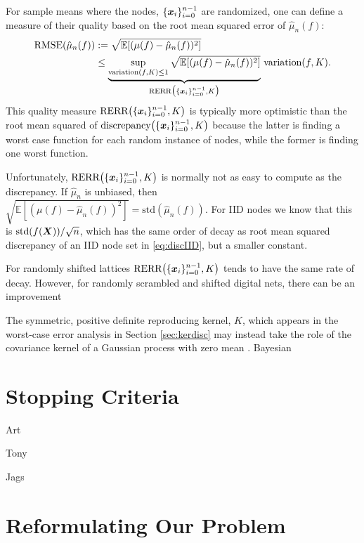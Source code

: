 \documentclass{svproc}
\begin{document}
For sample means where the nodes, $\{{\boldsymbol{x}}_i\}_{i=0}^{n-1}$ are randomized, one can define a measure of their quality based on the root mean squared error of $\hat{\mu}_n(f)$:
\begin{align}
    \text{RMSE}(\hat{\mu}_n(f)) & : = \sqrt{\mathbb{E}[(\mu(f) - \hat{\mu}_n(f))^2]} \\
    &\le \underbrace{ \sup_{\text{variation}(f,K) \le 1} \sqrt{\mathbb{E}[(\mu(f) - \hat{\mu}_n(f))^2]}}_{\text{RERR}\bigl(\{{\boldsymbol{x}}_i\}_{i=0}^{n-1},K\bigr)} \, \text{variation}(f,K).
\end{align}
This quality measure $\text{RERR}\bigl(\{{\boldsymbol{x}}_i\}_{i=0}^{n-1},K\bigr)$ is typically more optimistic than the root mean squared of  $\text{discrepancy}\bigl(\{{\boldsymbol{x}}_i\}_{i=0}^{n-1},K\bigr)$ because the latter is finding a worst case function for each random instance of nodes, while the former is finding one worst function.

Unfortunately, $\text{RERR}\bigl(\{{\boldsymbol{x}}_i\}_{i=0}^{n-1},K\bigr)$ is normally not as easy to compute as the discrepancy.  If $\hat{\mu}_n$ is unbiased, then $\sqrt{\mathbb{E}[(\mu(f) - \hat{\mu}_n(f))^2]} = \text{std}(\hat{\mu}_n(f))$.  For IID nodes we know that this is $\text{std}(f({\boldsymbol{X}}))/\sqrt{n}$, which has the same order of decay as root mean squared discrepancy of an IID node set in \eqref{eq:discIID}, but a smaller constant. 

For randomly shifted lattices $\text{RERR}\bigl(\{{\boldsymbol{x}}_i\}_{i=0}^{n-1},K\bigr)$ tends to have the same rate of decay.  However, for randomly scrambled and shifted digital nets, there can be an improvement

The symmetric, positive definite reproducing kernel, $K$, which appears in the worst-case error analysis in Section \ref{sec:kerdisc} may instead take the role of the covariance kernel of a Gaussian process with zero mean \cite{}.  Bayesian



\section{Stopping Criteria} \label{sec:stop}

Art

Tony

Jags

\section{Reformulating Our Problem} \label{sec:reformulate}
\end{document}
